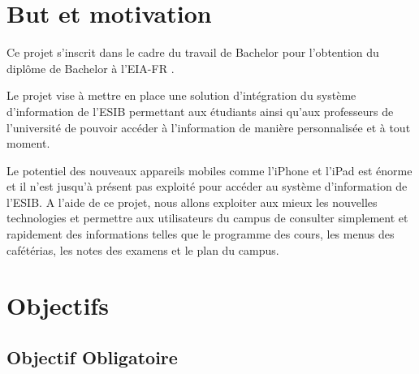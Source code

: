 
\section{But et motivation}
Ce projet s'inscrit dans le cadre du travail de Bachelor pour l'obtention du diplôme de Bachelor à l'\gls{EIA-FR} .

Le projet vise à mettre en place une solution d'intégration du système d'information de l'\gls{ESIB} permettant aux étudiants ainsi qu'aux professeurs de l'université de pouvoir accéder à l'information de manière personnalisée et à tout moment. 

Le potentiel des nouveaux appareils mobiles comme l'iPhone et l'iPad est énorme et il n'est jusqu'à présent pas exploité pour accéder au système d'information de l'\gls{ESIB}. A l'aide de ce projet, nous allons exploiter aux mieux les nouvelles technologies et permettre aux utilisateurs du campus de consulter simplement et rapidement des informations telles que le programme des cours, les menus des cafétérias, les notes des examens et le plan du campus.
\section{Objectifs}
\subsection{ Objectif Obligatoire}

